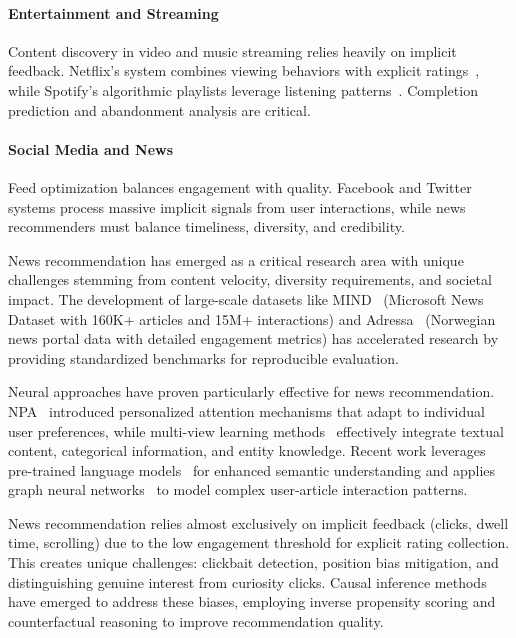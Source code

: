 \paragraph{Entertainment and Streaming}
Content discovery in video and music streaming relies heavily on implicit feedback. Netflix's system combines viewing behaviors with explicit ratings~\cite{gomez2015netflix}, while Spotify's algorithmic playlists leverage listening patterns~\cite{van2013deep}. Completion prediction and abandonment analysis are critical.

\paragraph{Social Media and News}
Feed optimization balances engagement with quality. Facebook and Twitter systems process massive implicit signals from user interactions, while news recommenders must balance timeliness, diversity, and credibility. 

News recommendation has emerged as a critical research area with unique challenges stemming from content velocity, diversity requirements, and societal impact. The development of large-scale datasets like MIND~\cite{wu2020mind_news} (Microsoft News Dataset with 160K+ articles and 15M+ interactions) and Adressa~\cite{gulla2017adressa} (Norwegian news portal data with detailed engagement metrics) has accelerated research by providing standardized benchmarks for reproducible evaluation.

Neural approaches have proven particularly effective for news recommendation. NPA~\cite{wu2019npa} introduced personalized attention mechanisms that adapt to individual user preferences, while multi-view learning methods~\cite{wu2019neural} effectively integrate textual content, categorical information, and entity knowledge. Recent work leverages pre-trained language models~\cite{wu2021empowering} for enhanced semantic understanding and applies graph neural networks~\cite{hu2020graph} to model complex user-article interaction patterns.

News recommendation relies almost exclusively on implicit feedback (clicks, dwell time, scrolling) due to the low engagement threshold for explicit rating collection. This creates unique challenges: clickbait detection, position bias mitigation, and distinguishing genuine interest from curiosity clicks. Causal inference methods~\cite{qi2021causal} have emerged to address these biases, employing inverse propensity scoring and counterfactual reasoning to improve recommendation quality.

